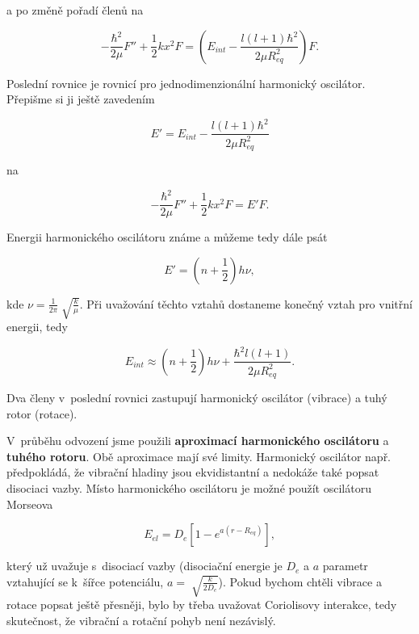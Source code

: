 \noindent a po změně pořadí členů na 

\begin{equation}
-\frac{\hbar^2}{2\mu}F''+\frac{1}{2}kx^2F=\left(E_{int}-\frac{l\left(l+1\right)\hbar^2}{2\mu R_{eq}^2}\right)F. 
\label{vibrot:vibrot5}
\end{equation}

\noindent Poslední rovnice je rovnicí pro jednodimenzionální harmonický oscilátor. Přepišme si ji ještě zavedením

\begin{displaymath}
E'=E_{int}-\frac{l\left(l+1\right)\hbar^2}{2\mu R_{eq}^2}
\end{displaymath}

\noindent na

\begin{equation}
-\frac{\hbar^2}{2\mu}F''+\frac{1}{2}kx^2F=E'F. 
\label{vibrot:vibrot6}
\end{equation}

Energii harmonického oscilátoru známe a můžeme tedy dále psát

\begin{equation}
E'=\left(n+\frac{1}{2}\right)h\nu,
\end{equation}

\noindent kde $\nu=\frac{1}{2\pi}\sqrt[]{\frac{k}{\mu}}$. Při uvažování těchto vztahů dostaneme konečný vztah pro vnitřní energii, tedy

\begin{equation}
\boxed{E_{int}\approx \left(n+\frac{1}{2}\right) h\nu+\frac{\hbar^2l(l+1)}{2\mu R_{eq}^2}.}
\end{equation}

\noindent Dva členy v~poslední rovnici zastupují harmonický oscilátor (vibrace) a tuhý rotor (rotace). 

\noindent V~průběhu odvození jsme použili \textbf{aproximací harmonického oscilátoru} a \textbf{tuhého rotoru}. Obě aproximace mají své limity. Harmonický oscilátor např. předpokládá, že vibrační hladiny jsou ekvidistantní a nedokáže také popsat disociaci vazby. Místo harmonického oscilátoru je možné použít oscilátoru Morseova

\begin{equation}
E_{el}=D_e\left[1-e^{a(r-R_{eq})}\right],
\end{equation}

\noindent který už uvažuje s~disociací vazby (disociační energie je $D_e$ a $a$ parametr vztahující se k~šířce potenciálu, $a=\sqrt[]{\frac{k}{2D_e}}$).
\noindent Pokud bychom chtěli vibrace a rotace popsat ještě přesněji, bylo by třeba uvažovat Coriolisovy interakce, tedy skutečnost, že vibrační a rotační pohyb není nezávislý.









